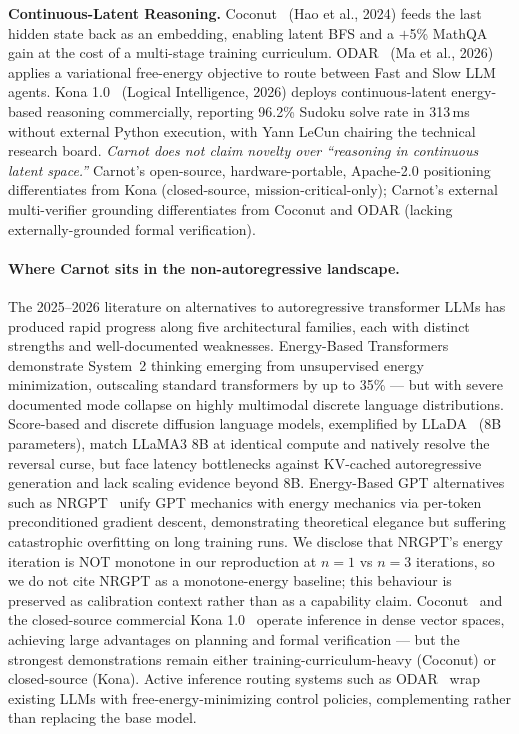 \documentclass[10pt]{article}
\begin{document}
\textbf{Continuous-Latent Reasoning.} Coconut~\cite{hao2024coconut}
(Hao et al., 2024) feeds the last hidden state back as an embedding,
enabling latent BFS and a $+$5\% MathQA gain at the cost of a
multi-stage training curriculum. ODAR~\cite{ma2026odar} (Ma et
al., 2026) applies a variational free-energy objective to route
between Fast and Slow LLM agents. Kona
1.0~\cite{logicalintelligence2026kona} (Logical Intelligence, 2026)
deploys continuous-latent energy-based reasoning commercially,
reporting 96.2\% Sudoku solve rate in 313\,ms without external Python
execution, with Yann LeCun chairing the technical research board.
\emph{Carnot does not claim novelty over ``reasoning in continuous
latent space.''} Carnot's open-source, hardware-portable, Apache-2.0
positioning differentiates from Kona (closed-source,
mission-critical-only); Carnot's external multi-verifier grounding
differentiates from Coconut and ODAR (lacking externally-grounded
formal verification).

\paragraph{Where Carnot sits in the non-autoregressive landscape.}
The 2025--2026 literature on alternatives to autoregressive
transformer LLMs has produced rapid progress along five architectural
families, each with distinct strengths and well-documented weaknesses.
Energy-Based Transformers~\cite{gladstone2025ebt} demonstrate System~2
thinking emerging from unsupervised energy minimization, outscaling
standard transformers by up to 35\% --- but with severe documented
mode collapse on highly multimodal discrete language distributions.
Score-based and discrete diffusion language models, exemplified by
LLaDA~\cite{nie2025llada} (8B parameters), match LLaMA3 8B at
identical compute and natively resolve the reversal curse, but face
latency bottlenecks against KV-cached autoregressive generation and
lack scaling evidence beyond 8B. Energy-Based GPT alternatives such
as NRGPT~\cite{lee2024nrgpt} unify GPT mechanics with energy
mechanics via per-token preconditioned gradient descent, demonstrating
theoretical elegance but suffering catastrophic overfitting on long
training runs. We disclose that NRGPT's energy iteration is NOT monotone
in our reproduction at $n=1$ vs $n=3$ iterations, so we do not cite NRGPT
as a monotone-energy baseline; this behaviour is preserved as calibration
context rather than as a capability claim.
Coconut~\cite{hao2024coconut} and the closed-source commercial
Kona 1.0~\cite{logicalintelligence2026kona} operate inference in
dense vector spaces, achieving large advantages on planning and
formal verification --- but the strongest demonstrations remain either
training-curriculum-heavy (Coconut) or closed-source (Kona). Active
inference routing systems such as ODAR~\cite{ma2026odar} wrap
existing LLMs with free-energy-minimizing control policies,
complementing rather than replacing the base model.
\end{document}
